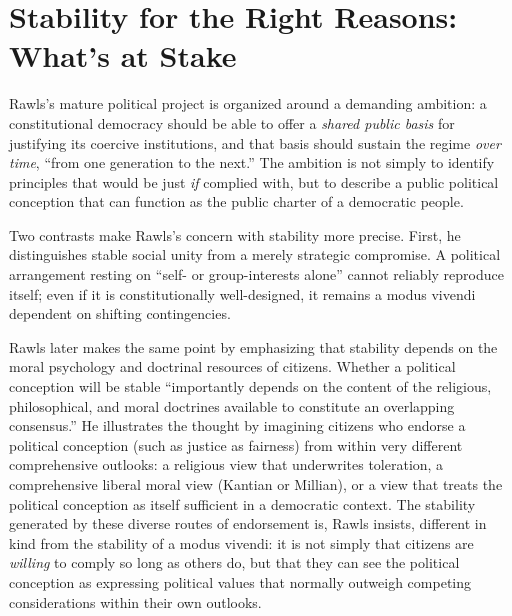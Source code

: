 \documentclass[12pt]{report}
\begin{document}
\section{Stability for the Right Reasons: What’s at Stake}

Rawls’s mature political project is organized around a demanding ambition: a constitutional democracy should be able to offer a \emph{shared public basis} for justifying its coercive institutions, and that basis should sustain the regime \emph{over time}, “from one generation to the next.” The ambition is not simply to identify principles that would be just \emph{if} complied with, but to describe a public political conception that can function as the public charter of a democratic people.

Two contrasts make Rawls's concern with stability more precise. First, he distinguishes stable social unity from a merely strategic compromise. A political arrangement resting on ``self- or group-interests alone'' cannot reliably reproduce itself; even if it is constitutionally well-designed, it remains a modus vivendi dependent on shifting contingencies.\parencite[p.~1]{rawls1987overlapping}

Rawls later makes the same point by emphasizing that stability depends on the moral psychology and doctrinal resources of citizens. Whether a political conception will be stable “importantly depends on the content of the religious, philosophical, and moral doctrines available to constitute an overlapping consensus.”\parencite[p.~250]{rawls1985justice} He illustrates the thought by imagining citizens who endorse a political conception (such as justice as fairness) from within very different comprehensive outlooks: a religious view that underwrites toleration, a comprehensive liberal moral view (Kantian or Millian), or a view that treats the political conception as itself sufficient in a democratic context.\parencite[pp.~250--251]{rawls1985justice} The stability generated by these diverse routes of endorsement is, Rawls insists, different in kind from the stability of a modus vivendi: it is not simply that citizens are \emph{willing} to comply so long as others do, but that they can see the political conception as expressing political values that normally outweigh competing considerations within their own outlooks.\parencite[p.~250]{rawls1985justice}
\end{document}
